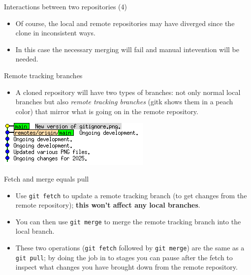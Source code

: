 \documentclass[usenames,dvipsnames]{beamer}
\newcommand{\code}[1]{\colorbox{light-gray}{\texttt{#1}}}
\begin{document}
\begin{frame}{Interactions between two repositories (4)}
  \begin{block}{}
    \begin{itemize}
      \item{Of course, the local and remote repositories may have diverged since the clone in inconsistent ways.}
      \item{In this case the necessary merging will fail and manual intevention will be needed.}
    \end{itemize}
  \end{block}
\end{frame}

\begin{frame}{Remote tracking branches}
  \begin{block}{}
    \begin{itemize}
      \item{A cloned repository will have two types of branches: not only normal local branches but also \textit{remote tracking branches} (gitk shows them in a peach color) that mirror what is going on in the remote repository.}
    \end{itemize}
    \begin{center}
      \includegraphics[scale=0.8]{RemoteTrackingBranch.png}
    \end{center}
  \end{block}
\end{frame}

\begin{frame}{Fetch and merge equals pull}
  \begin{block}{}
    \begin{itemize}
      \item{Use \code{git fetch} to update a remote tracking branch (to get changes from the remote repository); \textbf{this won't affect any local branches}.}
      \item{You can then use \code{git merge} to merge the remote tracking branch into the local branch.}
      \item{These two operations (\code{git fetch} followed by \code{git merge}) are the same as a \code{git pull}; by doing the job in to stages you can pause after the fetch to inspect what changes you have brought down from the remote repository.}
    \end{itemize}
  \end{block}
\end{frame}
\end{document}
